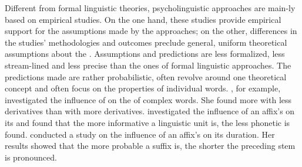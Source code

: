 Different from formal linguistic theories, psycholinguistic approaches are main-ly based on empirical studies. On the one hand, these studies provide empirical support for the assumptions made by the approaches; on the other, differences in the studies' methodologies and outcomes preclude general, uniform theoretical assumptions about the . Assumptions and predictions are less formalized, less stream-lined and less precise than the ones of formal linguistic approaches. The predictions made are rather probabilistic, often revolve around one theoretical concept and often focus on the properties of individual words. 
 \cite{Hay.2001,Hay.2003}, for example, investigated the influence of  on the  of complex words.  She found more  with less  derivatives than with more  derivatives. 
\cite{Pluymaekers.2010} investigated the influence of an affix's  on its  and found that the more informative a linguistic unit is, the less phonetic  is found. 
\cite{Cohen.2014} conducted a study on the influence of an affix's  on its duration. Her results showed that the more probable a suffix is, the shorter the preceding stem is pronounced.

